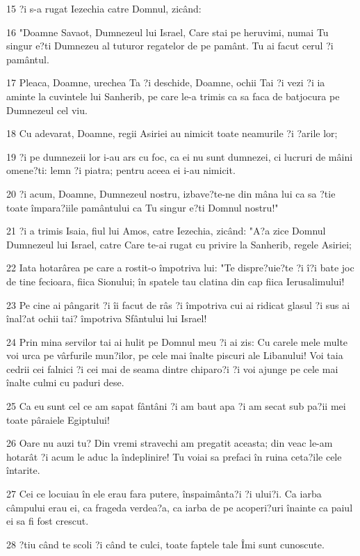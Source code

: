 \par 15 ?i s-a rugat Iezechia catre Domnul, zicând:
\par 16 "Doamne Savaot, Dumnezeul lui Israel, Care stai pe heruvimi, numai Tu singur e?ti Dumnezeu al tuturor regatelor de pe pamânt. Tu ai facut cerul ?i pamântul.
\par 17 Pleaca, Doamne, urechea Ta ?i deschide, Doamne, ochii Tai ?i vezi ?i ia aminte la cuvintele lui Sanherib, pe care le-a trimis ca sa faca de batjocura pe Dumnezeul cel viu.
\par 18 Cu adevarat, Doamne, regii Asiriei au nimicit toate neamurile ?i ?arile lor;
\par 19 ?i pe dumnezeii lor i-au ars cu foc, ca ei nu sunt dumnezei, ci lucruri de mâini omene?ti: lemn ?i piatra; pentru aceea ei i-au nimicit.
\par 20 ?i acum, Doamne, Dumnezeul nostru, izbave?te-ne din mâna lui ca sa ?tie toate împara?iile pamântului ca Tu singur e?ti Domnul nostru!"
\par 21 ?i a trimis Isaia, fiul lui Amos, catre Iezechia, zicând: "A?a zice Domnul Dumnezeul lui Israel, catre Care te-ai rugat cu privire la Sanherib, regele Asiriei;
\par 22 Iata hotarârea pe care a rostit-o împotriva lui: "Te dispre?uie?te ?i î?i bate joc de tine fecioara, fiica Sionului; în spatele tau clatina din cap fiica Ierusalimului!
\par 23 Pe cine ai pângarit ?i îi facut de râs ?i împotriva cui ai ridicat glasul ?i sus ai înal?at ochii tai? împotriva Sfântului lui Israel!
\par 24 Prin mina servilor tai ai hulit pe Domnul meu ?i ai zis: Cu carele mele multe voi urca pe vârfurile mun?ilor, pe cele mai înalte piscuri ale Libanului! Voi taia cedrii cei falnici ?i cei mai de seama dintre chiparo?i ?i voi ajunge pe cele mai înalte culmi cu paduri dese.
\par 25 Ca eu sunt cel ce am sapat fântâni ?i am baut apa ?i am secat sub pa?ii mei toate pâraiele Egiptului!
\par 26 Oare nu auzi tu? Din vremi stravechi am pregatit aceasta; din veac le-am hotarât ?i acum le aduc la îndeplinire! Tu voiai sa prefaci în ruina ceta?ile cele întarite.
\par 27 Cei ce locuiau în ele erau fara putere, înspaimânta?i ?i ului?i. Ca iarba câmpului erau ei, ca frageda verdea?a, ca iarba de pe acoperi?uri înainte ca paiul ei sa fi fost crescut.
\par 28 ?tiu când te scoli ?i când te culci, toate faptele tale Îmi sunt cunoscute.
